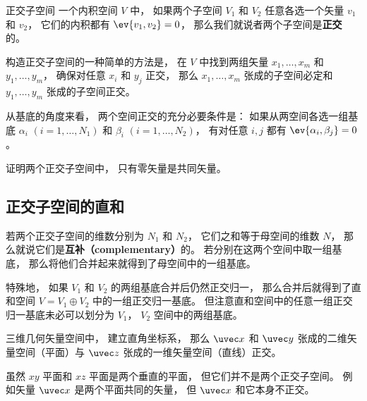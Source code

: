 
\begin{issues}
\issueTODO
\end{issues}


\begin{definition}{正交子空间}
一个内积空间 $V$ 中， 如果两个子空间 $V_1$ 和 $V_2$ 任意各选一个矢量 ${v_1}$ 和 ${v_2}$， 它们的内积都有 $\ev{v_1, v_2} = 0$， 那么我们就说者两个子空间是\textbf{正交}的。
\end{definition}

构造正交子空间的一种简单的方法是， 在 $V$ 中找到两组矢量 $x_1, \dots, x_m$ 和 $y_1, \dots, y_m$， 确保对任意 $x_i$ 和 $y_j$ 正交， 那么 $x_1, \dots, x_m$ 张成的子空间必定和 $y_1, \dots, y_m$ 张成的子空间正交。

\begin{theorem}{}
从基底的角度来看， 两个空间正交的充分必要条件是： 如果从两空间各选一组基底 ${\alpha_i}$ $(i = 1, \dots, N_1)$ 和 ${\beta_i}$ $(i = 1, \dots, N_2)$， 有对任意 $i, j$ 都有 $\ev{\alpha_i, \beta_j} = 0$。
\end{theorem}

\begin{exercise}{}
证明两个正交子空间中， 只有零矢量是共同矢量。
\end{exercise}

\subsection{正交子空间的直和}

若两个正交子空间的维数分别为 $N_1$ 和 $N_2$， 它们之和等于母空间的维数 $N$， 那么就说它们是\textbf{互补（complementary）}的。 若分别在这两个空间中取一组基底， 那么将他们合并起来就得到了母空间中的一组基底。

特殊地， 如果 $V_1$ 和 $V_2$ 的两组基底合并后仍然正交归一， 那么合并后就得到了直和空间 $V = V_1 \oplus V_2$ 中的一组正交归一基底。 但注意直和空间中的任意一组正交归一基底未必可以划分为 $V_1$， $V_2$ 空间中的两组基底。

\begin{example}{}
三维几何矢量空间中， 建立直角坐标系， 那么 $\uvec x$ 和 $\uvec y$ 张成的二维矢量空间（平面）与 $\uvec z$ 张成的一维矢量空间（直线）正交。
\end{example}

\begin{example}{}
虽然 $xy$ 平面和 $xz$ 平面是两个垂直的平面， 但它们并不是两个正交子空间。 例如矢量 $\uvec x$ 是两个平面共同的矢量， 但 $\uvec x$ 和它本身不正交。
\end{example}

